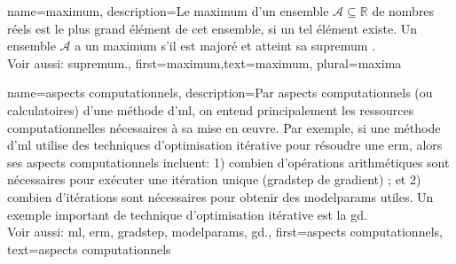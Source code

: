 {
	name=maximum,
	description={Le maximum d’un ensemble $\mathcal{A} \subseteq \mathbb{R}$ de nombres réels est le plus grand élément de cet ensemble, si un tel élément existe. Un ensemble $\mathcal{A}$ a un maximum s’il est majoré et atteint sa \gls{supremum} \cite[Sec.~1.4]{RudinBookPrinciplesMatheAnalysis}.
	\\
	Voir aussi: \gls{supremum}.},
	first={maximum},text={maximum}, plural={maxima}
}

{
	name={aspects computationnels},
	description={Par aspects computationnels (ou calculatoires) d’une méthode d'\gls{ml}, on entend principalement les ressources computationnelles nécessaires à sa mise en œuvre. Par exemple, si une méthode d'\gls{ml} utilise des techniques d’optimisation itérative pour résoudre une \gls{erm}, alors ses aspects computationnels incluent: 1) combien d’opérations arithmétiques sont nécessaires pour exécuter une itération unique (\gls{gradstep} de gradient) ; et 2) combien d’itérations sont nécessaires pour obtenir des \glspl{modelparam} utiles. Un exemple important de technique d’optimisation itérative est la \gls{gd}.
		\\ 
		Voir aussi: \gls{ml}, \gls{erm}, \gls{gradstep}, \glspl{modelparam}, \gls{gd}.},
	first={aspects computationnels},
	text={aspects computationnels}
}

